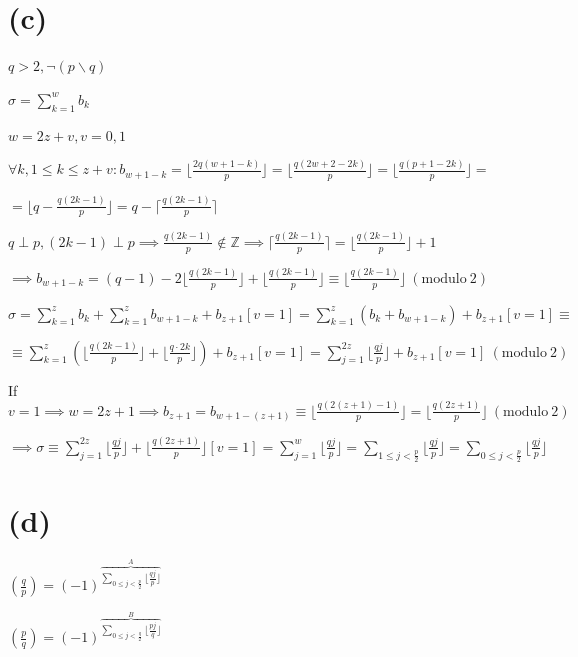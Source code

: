 \documentclass{article}
\begin{document}
\section*{(c)}

\( q > 2, \lnot(p \backslash q) \)

\( \sigma = \sum_{k=1}^{w} b_{k} \)

\( w = 2z + v, v = 0,1 \)

\( \forall k, 1 \leq k \leq z + v: b_{w+1-k}= \lfloor{\frac{2q(w+1-k)}{p}}\rfloor = \lfloor{\frac{q(2w+2-2k)}{p}}\rfloor = \lfloor{\frac{q(p+1-2k)}{p}}\rfloor = \)

\( = \lfloor{q - \frac{q(2k-1)}{p}}\rfloor = q - \lceil\frac{q(2k-1)}{p}\rceil \)

\( q \perp p, (2k - 1) \perp p \implies \frac{q(2k-1)}{p} \notin \mathbb{Z} \implies \lceil\frac{q(2k-1)}{p}\rceil = \lfloor\frac{q(2k-1)}{p}\rfloor + 1 \)

\( \implies b_{w+1-k} = (q - 1) - 2\lfloor\frac{q(2k-1)}{p}\rfloor + \lfloor\frac{q(2k-1)}{p}\rfloor \equiv \lfloor\frac{q(2k-1)}{p} \rfloor \ (\mathrm{modulo}\ 2) \)

\( \sigma = \sum_{k=1}^{z} b_{k} + \sum_{k=1}^{z} b_{w+1-k} + b_{z+1}[v=1] = \sum_{k=1}^{z}(b_{k}+b_{w+1-k}) + b_{z+1}[v=1] \equiv \)

\( \equiv \sum_{k=1}^{z}(\lfloor\frac{q(2k-1)}{p}\rfloor + \lfloor\frac{q\cdot 2k}{p}\rfloor) + b_{z+1}[v=1] = \sum_{j=1}^{2z} \lfloor\frac{qj}{p}\rfloor + b_{z+1}[v=1] \ (\mathrm{modulo}\ 2) \)

If \( v = 1 \implies w = 2z + 1 \implies b_{z+1} = b_{w+1-(z+1)} \equiv \lfloor{\frac{q(2(z+1)-1)}{p}}\rfloor = \lfloor{\frac{q(2z+1)}{p}}\rfloor \ (\mathrm{modulo}\ 2) \)

\( \implies \sigma \equiv \sum_{j=1}^{2z} \lfloor\frac{qj}{p}\rfloor + \lfloor{\frac{q(2z+1)}{p}}\rfloor[v=1] = \sum_{j=1}^{w} \lfloor\frac{qj}{p}\rfloor = \sum_{1 \leq j < \frac{p}{2}} \lfloor\frac{qj}{p}\rfloor = \sum_{0 \leq j < \frac{p}{2}} \lfloor\frac{qj}{p}\rfloor \)

\section*{(d)}

\( (\frac{q}{p}) = {(-1)}^{\overbrace{\sum_{0 \leq j < \frac{p}{2}} \lfloor\frac{qj}{p}\rfloor}^{A}} \)

\( (\frac{p}{q}) = {(-1)}^{\overbrace{\sum_{0 \leq j < \frac{q}{2}} \lfloor\frac{pj}{q}\rfloor}^{B}} \)
\end{document}
